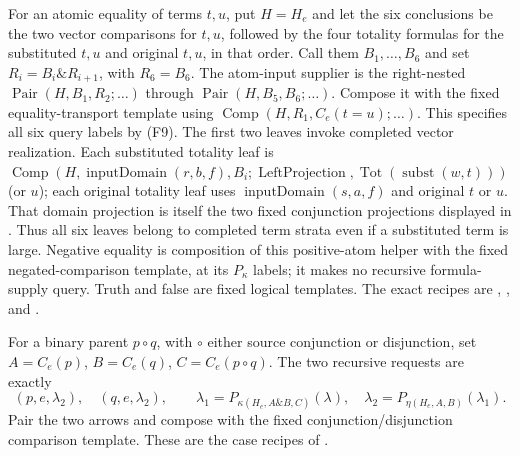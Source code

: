 For an atomic equality of terms $t,u$, put $H=H_e$ and let the six
conclusions be the two vector comparisons for $t,u$, followed by
the four totality formulas for the substituted $t,u$ and original
$t,u$, in that order.  Call them $B_1,\ldots,B_6$ and set
$R_i=B_i\mathbin\&R_{i+1}$, with $R_6=B_6$.
The atom-input supplier is the right-nested
$\operatorname{Pair}(H,B_1,R_2;\ldots)$ through
$\operatorname{Pair}(H,B_5,B_6;\ldots)$.
Compose it with the fixed equality-transport template using
$\operatorname{Comp}(H,R_1,C_e(t=u);\ldots)$.
This specifies all six query labels by (F9).
The first two leaves invoke completed vector realization.  Each
substituted totality leaf is
$\operatorname{Comp}(H,\operatorname{inputDomain}(r,b,f),B_i;
 \operatorname{LeftProjection},\operatorname{Tot}(\operatorname{subst}(w,t)))$
(or $u$); each original totality leaf uses
$\operatorname{inputDomain}(s,a,f)$ and original $t$ or $u$.
That domain projection is itself the two fixed conjunction
projections displayed in
.
Thus all six leaves belong to completed term strata even if a
substituted term is large.
Negative equality is composition of this positive-atom helper with
the fixed negated-comparison template, at its $P_\kappa$ labels;
it makes no recursive formula-supply query.  Truth and false are
fixed logical templates.  The exact recipes are
,
, and
.

For a binary parent $p\circ q$, with $\circ$ either source
conjunction or disjunction, set
$A=C_e(p)$, $B=C_e(q)$, $C=C_e(p\circ q)$.
The two recursive requests are exactly
\[
 (p,e,\lambda_2),\quad(q,e,\lambda_2),\qquad
 \lambda_1=P_{\kappa(H_e,A\mathbin\&B,C)}(\lambda),\quad
 \lambda_2=P_{\eta(H_e,A,B)}(\lambda_1).
 \tag{F11}
\]
Pair the two arrows and compose with the fixed conjunction/disjunction
comparison template.  These are the case recipes of
.

